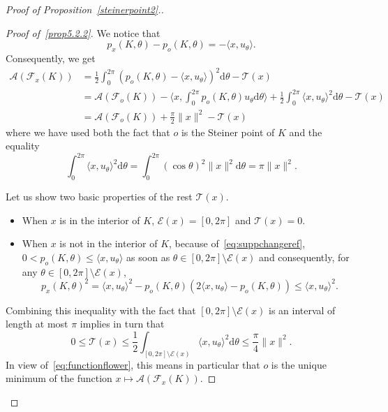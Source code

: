 \documentclass[AHL,Unicode,longabstracts,published]{cedram}
\newcommand{\cA}{\mathcal{A}}
\newcommand{\cE}{\mathcal{E}}
\newcommand{\cF}{\mathcal{F}}
\newcommand{\cT}{\mathcal{T}}
\newcommand{\dd}{\mathrm{d}}
\newcommand{\pass}{\vspace{0.3cm}\noindent}
\newcommand{\noi}{\noindent}
\newenvironment*{lastprooff}{\begin{proof}}{\end{proof}}
\begin{document}
\begin{proof}[{Proof of Proposition~\ref{steinerpoint2}.}]
\begin{lastprooff}[{Proof of~\eqref{prop5.2.2}}]
We notice that
\begin{equation}\label{eq:suppchangeref}
p_x(K,\theta) -p_o(K,\theta) = -\langle x, u_{\theta}\rangle.
\end{equation}
Consequently, we get
\begin{align}
\cA(\cF_x(K)) & =\frac1{2}\int_{0}^{2\pi} \left(p_o(K,\theta)-\langle x,u_{\theta}\rangle\right)^2\dd\theta-{\cT}(x)\nonumber\\
& =\cA(\cF_o(K))-\Big\langle x, \int_0^{2\pi} p_o(K,\theta)u_{\theta}\dd\theta\Big\rangle +\frac1{2}\int_0^{2\pi}\langle x,u_{\theta}\rangle^2\dd\theta-{\cT}(x)\nonumber\\
& =\cA(\cF_o(K))+\frac{\pi}{2}\|x\|^2-{\cT}(x)\label{eq:functionflower}
\end{align}
where we have used both the fact that $o$ is the Steiner point of $K$ and the equality
\begin{equation*}
\int_0^{2\pi}\langle x,u_{\theta}\rangle^2\dd\theta= \int_0^{2\pi}(\cos\theta)^2\|x\|^2\dd\theta =\pi \|x\|^2.
\end{equation*}

Let us show two basic properties of the rest ${\cT}(x)$.
\begin{itemize}
\item[-] When $x$ is in the interior of $K$, $\cE(x)=[0,2\pi]$ and ${\cT}(x)=0$.
\item[-] When $x$ is not in the interior of $K$, because of~\eqref{eq:suppchangeref}, $0<p_o(K,\theta)\le \langle x,u_\theta\rangle$ as soon as $\theta\in [0,2\pi]\setminus\cE(x)$ and consequently, for any $\theta\in [0,2\pi]\setminus\cE(x)$,
\begin{equation*}
p_x(K,\theta)^2=\langle x,u_\theta\rangle^2-p_o(K,\theta)(2\langle x,u_\theta\rangle-p_o(K,\theta))\le \langle x,u_\theta\rangle^2.
\end{equation*}
\end{itemize}

Combining this inequality with the fact that $[0,2\pi]\setminus \cE(x)$ is an interval of length at most $\pi$ implies in turn that
\begin{equation*}\label{eq:boundR(x)}
0\le {\cT}(x)\le \frac12\int_{[0,2\pi]\setminus\cE(x)} \langle x,u_\theta\rangle^2\dd\theta\le \frac{\pi}{4}\|x\|^2.
\end{equation*}
In view of~\eqref{eq:functionflower}, this means in particular that $o$ is the unique minimum of the function $x\longmapsto \cA(\cF_x(K))$.


\end{lastprooff}
\end{proof}
\end{document}
